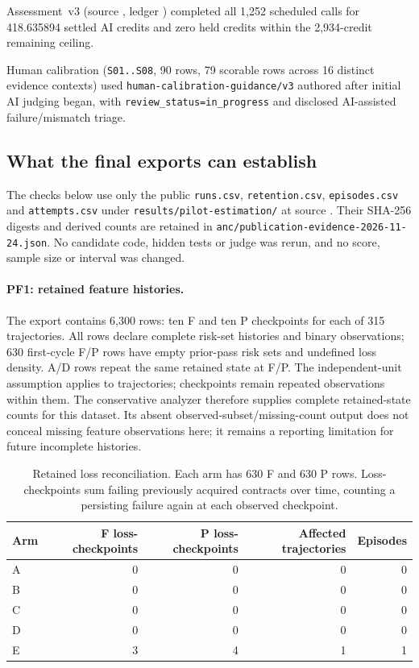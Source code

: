 Assessment~v3
(source , ledger )
completed all 1,252 scheduled calls for 418.635894 settled AI credits and
zero held credits within the 2,934-credit remaining ceiling.

Human
calibration (\texttt{S01..S08}, 90 rows, 79 scorable rows across 16 distinct
evidence contexts) used \nolinkurl{human-calibration-guidance/v3} authored after
initial AI judging began, with \nolinkurl{review_status=in_progress} and
disclosed AI-assisted failure/mismatch triage.
\par
\endgroup

\FloatBarrier
\subsection{What the final exports can establish}\label{app:reportingdisposition}

The checks below use only the public
\nolinkurl{runs.csv}, \nolinkurl{retention.csv}, \nolinkurl{episodes.csv}
and \nolinkurl{attempts.csv} under
\nolinkurl{results/pilot-estimation/} at source .
Their SHA-256 digests and derived counts are retained in
\nolinkurl{anc/publication-evidence-2026-11-24.json}. No candidate code, hidden
tests or judge was rerun, and no score, sample size or interval was changed.

\paragraph{PF1: retained feature histories.}
The export contains 6,300 rows: ten F and ten P checkpoints for each of
315 trajectories. All rows declare complete risk-set histories and binary
observations; 630 first-cycle F/P rows have empty prior-pass risk sets and
undefined loss density. A/D rows repeat the same retained state at F/P.
The independent-unit assumption applies to trajectories; checkpoints
remain repeated observations within them.
The conservative analyzer therefore supplies complete retained-state
counts for this dataset. Its absent observed-subset/missing-count output
does not conceal missing feature observations here; it remains a reporting
limitation for future incomplete histories.

\begin{table}[!htbp]
\centering\small
\caption{Retained loss reconciliation. Each arm has 630 F and 630 P rows.
Loss-checkpoints sum failing previously acquired contracts over time,
counting a persisting failure again at each observed checkpoint.}\label{tab:retentionreconciliation}

\begin{tabular*}{\textwidth}{@{\extracolsep{\fill}}lrrrr@{}}
\toprule
Arm & F loss-checkpoints & P loss-checkpoints & Affected trajectories & Episodes \\
\midrule
A & 0 & 0 & 0 & 0 \\
B & 0 & 0 & 0 & 0 \\
C & 0 & 0 & 0 & 0 \\
D & 0 & 0 & 0 & 0 \\
E & 3 & 4 & 1 & 1 \\
\bottomrule
\end{tabular*}
\end{table}

